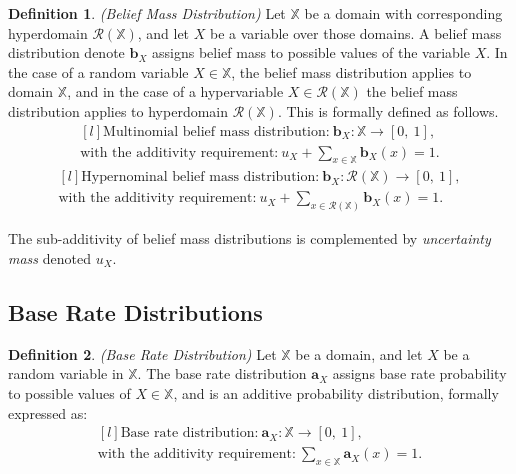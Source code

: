 \documentclass[a4paper,12pt]{article}
\theoremstyle{definition}
\newtheorem{definition}{Definition}[section]
\numberwithin{equation}{section}
\begin{document}
\begin{definition}
	\emph{(Belief Mass Distribution)} Let $\mathbb{X}$ be a domain with corresponding hyperdomain $\mathcal{R}(\mathbb{X})$, and let $X$ be a variable over those domains. A belief mass distribution denote $\mathbf{b}_X$ assigns belief mass to possible values of the variable $X$. In the case of a random variable $X \in \mathbb{X}$, the belief mass distribution applies to domain $\mathbb{X}$, and in the case of a hypervariable $X \in \mathcal{R}(\mathbb{X})$ the belief mass distribution applies to hyperdomain $\mathcal{R}(\mathbb{X})$. This is formally defined as follows.
	\begin{equation}\label{eq:multinomial-belief-mass-dristribution}
		\begin{matrix*}[l]
			\text{Multinomial belief mass distribution:}\ \mathbf{b}_X : \mathbb{X} \rightarrow [0,\ 1], \\
			\text{with the additivity requirement:}\ u_X + \sum_{x \in \mathbb{X}} \mathbf{b}_X(x) = 1\text{.}
		\end{matrix*}
	\end{equation}
	\begin{equation}
		\begin{matrix*}[l]
			\text{Hypernominal belief mass distribution:}\ \mathbf{b}_X : \mathcal{R}(\mathbb{X}) \rightarrow [0,\ 1], \\
			\text{with the additivity requirement:}\ u_X + \sum_{x \in \mathcal{R}(\mathbb{X})} \mathbf{b}_X(x) = 1\text{.}
		\end{matrix*}
	\end{equation}
\end{definition}

The sub-additivity of belief mass distributions is complemented by \emph{uncertainty mass} denoted $u_X$.

\subsection{Base Rate Distributions}

\begin{definition}\label{def:base_rate_distribution}
	\emph{(Base Rate Distribution)} Let $\mathbb{X}$ be a domain, and let $X$ be a random variable in $\mathbb{X}$. The base rate distribution $\mathbf{a}_X$ assigns base rate probability to possible values of $X \in \mathbb{X}$, and is an additive probability distribution, formally expressed as:
	\begin{equation}\label{eq:base_rate_distribution}
		\begin{matrix*}[l]
			\text{Base rate distribution:}\ \mathbf{a}_X : \mathbb{X} \rightarrow [0,\ 1], \\
			\text{with the additivity requirement:}\ \sum_{x \in \mathbb{X}} \mathbf{a}_X(x) = 1\text{.}
		\end{matrix*}
	\end{equation}
\end{definition}
\end{document}
